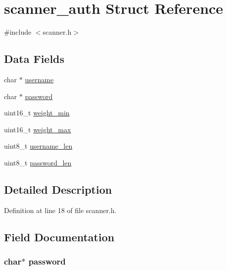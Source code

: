 \hypertarget{structscanner__auth}{}\section{scanner\+\_\+auth Struct Reference}
\label{structscanner__auth}


{\ttfamily \#include $<$scanner.\+h$>$}

\subsection*{Data Fields}
\begin{DoxyCompactItemize}
\item 
char $\ast$ \hyperlink{structscanner__auth_a9b20c006bd90a09e1465fb668700e81d}{username}
\item 
char $\ast$ \hyperlink{structscanner__auth_a59460a3ff2c12443d1022e5cc0fba85c}{password}
\item 
uint16\+\_\+t \hyperlink{structscanner__auth_a72d652522736ba740b7463fb533e135b}{weight\+\_\+min}
\item 
uint16\+\_\+t \hyperlink{structscanner__auth_a83fa51ce880e8f550cf903dc26025045}{weight\+\_\+max}
\item 
uint8\+\_\+t \hyperlink{structscanner__auth_a3b15fd48e21125b374d9566675fc3a1f}{username\+\_\+len}
\item 
uint8\+\_\+t \hyperlink{structscanner__auth_a53e93aacf765392db0eba470df03a9b9}{password\+\_\+len}
\end{DoxyCompactItemize}


\subsection{Detailed Description}


Definition at line 18 of file scanner.\+h.



\subsection{Field Documentation}
\subsubsection[{\texorpdfstring{password}{password}}]{\setlength{\rightskip}{0pt plus 5cm}char$\ast$ password}\hypertarget{structscanner__auth_a59460a3ff2c12443d1022e5cc0fba85c}{}\label{structscanner__auth_a59460a3ff2c12443d1022e5cc0fba85c}


